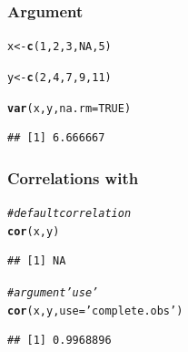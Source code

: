 \documentclass[12pt]{beamer}\usepackage[]{graphicx}\usepackage[]{color}
\makeatletter
\newcommand{\hlnum}[1]{\textcolor[rgb]{0.686,0.059,0.569}{#1}}%
\newcommand{\hlstr}[1]{\textcolor[rgb]{0.192,0.494,0.8}{#1}}%
\newcommand{\hlcom}[1]{\textcolor[rgb]{0.678,0.584,0.686}{\textit{#1}}}%
\newcommand{\hlstd}[1]{\textcolor[rgb]{0.345,0.345,0.345}{#1}}%
\newcommand{\hlkwb}[1]{\textcolor[rgb]{0.69,0.353,0.396}{#1}}%
\newcommand{\hlkwc}[1]{\textcolor[rgb]{0.333,0.667,0.333}{#1}}%
\newcommand{\hlkwd}[1]{\textcolor[rgb]{0.737,0.353,0.396}{\textbf{#1}}}%
\newenvironment{kframe}{%
 \def\at@end@of@kframe{}%
 \ifinner\ifhmode%
  \def\at@end@of@kframe{\end{minipage}}%
  \begin{minipage}{\columnwidth}%
 \fi\fi%
 \def\FrameCommand##1{\hskip\@totalleftmargin \hskip-\fboxsep
 \colorbox{shadecolor}{##1}\hskip-\fboxsep
     \hskip-\linewidth \hskip-\@totalleftmargin \hskip\columnwidth}%
 \MakeFramed {\advance\hsize-\width
   \@totalleftmargin\z@ \linewidth\hsize
   \@setminipage}}%
 {\par\unskip\endMakeFramed%
 \at@end@of@kframe}
\newenvironment{knitrout}{}{} %
\makeatother
\begin{document}

\begin{frame}[fragile]
\frametitle{Argument }

\begin{knitrout}\footnotesize
{}\color{fgcolor}\begin{kframe}
\begin{alltt}
\hlstd{x} \hlkwb{<-} \hlkwd{c}\hlstd{(}\hlnum{1}\hlstd{,} \hlnum{2}\hlstd{,} \hlnum{3}\hlstd{,} \hlnum{NA}\hlstd{,} \hlnum{5}\hlstd{)}

\hlstd{y} \hlkwb{<-} \hlkwd{c}\hlstd{(}\hlnum{2}\hlstd{,} \hlnum{4}\hlstd{,} \hlnum{7}\hlstd{,} \hlnum{9}\hlstd{,} \hlnum{11}\hlstd{)}

\hlkwd{var}\hlstd{(x, y,} \hlkwc{na.rm} \hlstd{=} \hlnum{TRUE}\hlstd{)}
\end{alltt}
\begin{verbatim}
## [1] 6.666667
\end{verbatim}
\end{kframe}
\end{knitrout}

\end{frame}


\begin{frame}[fragile]
\frametitle{Correlations with }

\begin{knitrout}\footnotesize
{}\color{fgcolor}\begin{kframe}
\begin{alltt}
\hlcom{# default correlation}
\hlkwd{cor}\hlstd{(x, y)}
\end{alltt}
\begin{verbatim}
## [1] NA
\end{verbatim}
\begin{alltt}
\hlcom{# argument 'use'}
\hlkwd{cor}\hlstd{(x, y,} \hlkwc{use} \hlstd{=} \hlstr{'complete.obs'}\hlstd{)}
\end{alltt}
\begin{verbatim}
## [1] 0.9968896
\end{verbatim}
\end{kframe}
\end{knitrout}

\end{frame}
\end{document}
